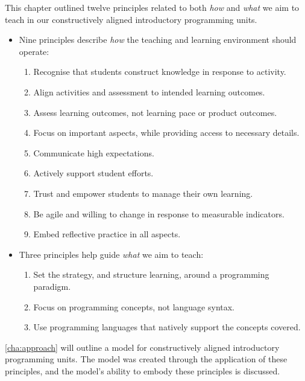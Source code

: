 This chapter outlined twelve principles related to both \emph{how} and \emph{what} we aim to teach in our constructively aligned introductory programming units.
\begin{itemize}[noitemsep,nolistsep]
	\item Nine principles describe \emph{how} the teaching and learning environment should operate:
	\begin{enumerate}
		\item \label{itm:construct} Recognise that students construct knowledge in response to activity.
		\item \label{itm:align} Align activities and assessment to intended learning outcomes.
		\item \label{itm:formative} Assess learning outcomes, not learning pace or product outcomes.
		\item \label{itm:focus} Focus on important aspects, while providing access to necessary details.
		\item \label{itm:expectations} Communicate high expectations.
		\item \label{itm:support} Actively support student efforts.
		\item \label{itm:theory_y} Trust and empower students to manage their own learning.
		\item \label{itm:agile} Be agile and willing to change in response to measurable indicators.
		\item \label{itm:reflect} Embed reflective practice in all aspects.
	\end{enumerate}
	\item Three principles help guide \emph{what} we aim to teach:
	\begin{enumerate}[start=10,noitemsep,nolistsep]
		\item \label{itm:paradigm} Set the strategy, and structure learning, around a programming paradigm.
		\item \label{itm:concepts} Focus on programming concepts, not language syntax.
		\item \label{itm:authentic} Use programming languages that natively support the concepts covered.
	\end{enumerate}
\end{itemize}

\cref{cha:approach} will outline a model for constructively aligned introductory programming units. The model was created through the application of these principles, and the model's ability to embody these principles is discussed.


